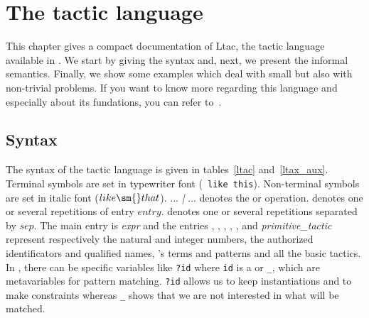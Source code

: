 \chapter{The tactic language}
\label{TacticLanguage}


This chapter gives a compact documentation of Ltac, the tactic
language available in {\Coq}. We start by giving the syntax and, next,
we present the informal semantics. Finally, we show some examples which
deal with small but also with non-trivial problems. If you want to
know more regarding this language and especially about its fundations,
you can refer to~\cite{Del00}.

\section{Syntax}

\def\tacexpr{\textrm{\textsl{expr}}}
\def\tacexprinf{\textrm{\textsl{tacexpr$_i$}}}
\def\tacexprpref{\textrm{\textsl{tacexpr$_p$}}}
\def\atom{\textrm{\textsl{atom}}}
\def\recclause{\textrm{\textsl{rec\_clause}}}
\def\letclause{\textrm{\textsl{let\_clause}}}
\def\matchrule{\textrm{\textsl{match\_rule}}}
\def\contextrule{\textrm{\textsl{context\_rule}}}
\def\contexthyps{\textrm{\textsl{context\_hyps}}}
\def\primitivetactic{\textrm{\textsl{primitive\_tactic}}}
\def\tacarg{\textrm{\textsl{arg}}}
\def\qstring{\textrm{\textsl{string}}}


The syntax of the tactic language is given in tables~\ref{ltac}
and~\ref{ltax_aux}.  Terminal symbols are set in typewriter font ({\tt
like this}).  Non-terminal symbols are set in italic font
($like\sm{}that$). ... {\it |} ... denotes the or
operation.  denotes one or several repetitions of
entry $entry$.  denotes one or several
repetitions separated by $sep$.
The main entry is {\tacexpr} and the entries {\naturalnumber},
{\integer}, {\ident}, {\qualid}, {\term}, {\pattern} and
{\primitivetactic} represent respectively the natural and integer
numbers, the authorized identificators and qualified names, {\Coq}'s
terms and patterns and all the basic tactics. In {\pattern}, there can
be specific variables like {\tt ?id} where {\tt id} is a {\ident} or
{\tt \_}, which are metavariables for pattern matching. {\tt ?id} allows
us to keep instantiations and to make constraints whereas {\tt \_}
shows that we are not interested in what will be matched.

